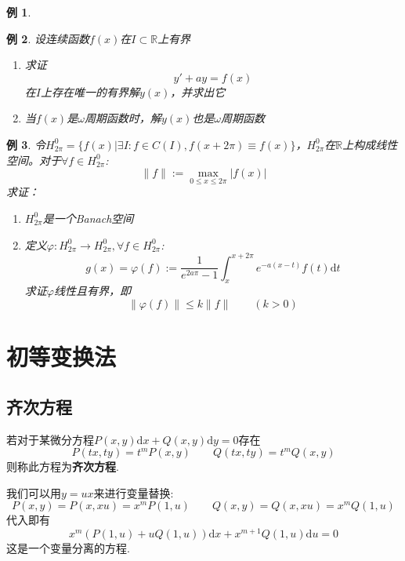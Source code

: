 \documentclass[UTF8]{book}
\newcommand{\R}{\mathbb{R}}
\renewcommand{\d}{\mathrm{d}}
\newtheorem{example}{例}
\begin{document}
\begin{example}
    \end{example}\begin{example}
        设连续函数$f(x)$在$I\subset \R$上有界\begin{enumerate}
            \item 求证$$y'+ay=f(x)$$在$I$上存在唯一的有界解$y(x)$，并求出它
            \item 当$f(x)$是$\omega$周期函数时，解$y(x)$也是$\omega$周期函数
        \end{enumerate}
    \end{example}\begin{example}
        令$H^0_{2\pi}=\{f(x)|\exists I:f\in C(I),f(x+2\pi)\equiv f(x)\}$，$H^0_{2\pi}$在$\R$上构成线性空间。对于$\forall f\in H^0_{2\pi}$:$$\|f\|:=\max_{0\leq x\leq 2\pi}|f(x)|$$
        求证：\begin{enumerate}
            \item $H^0_{2\pi}$是一个Banach空间
            \item 定义$\varphi:H^0_{2\pi}\to H^0_{2\pi},\forall f\in H^0_{2\pi}$:$$g(x)=\varphi(f):=\frac{1}{e^{2a\pi}-1}\int^{x+2\pi}_x e^{-a(x-t)}f(t)\d t$$求证$\varphi$线性且有界，即$$\|\varphi(f)\|\leq k\|f\|\qquad (k>0)$$
        \end{enumerate}
    \end{example}
    \section{初等变换法}
    \subsection{齐次方程}
    若对于某微分方程\(P(x,y)\d x+Q(x,y)\d y=0\)存在\[P(tx,ty)=t^mP(x,y)\qquad Q(tx,ty)=t^mQ(x,y)\]则称此方程为\textbf{齐次方程}.

    我们可以用\(y=ux\)来进行变量替换:\[P(x,y)=P(x,xu)=x^mP(1,u)\qquad Q(x,y)=Q(x,xu)=x^mQ(1,u)\]
    代入即有\[x^m\left( P(1,u)+uQ(1,u) \right)\d x+x^{m+1}Q(1,u)\d u=0\]
    这是一个变量分离的方程.

    
\end{document}
